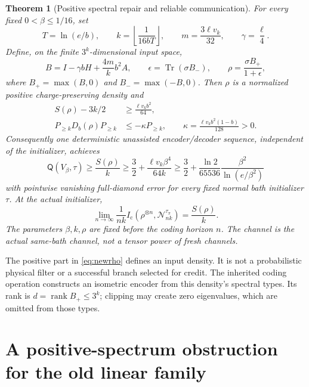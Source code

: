 \documentclass[11pt]{article}
\newtheorem{theorem}{Theorem}[section]
\newcommand{\Tr}{\operatorname{Tr}}
\newcommand{\rank}{\operatorname{rank}}
\newcommand{\Ic}{I_{\mathrm c}}
\newcommand{\Qcap}{\mathsf Q}
\begin{document}
\begin{theorem}[Positive spectral repair and reliable communication]
\label{thm:newrate}
For every fixed \(0<\beta\le1/16\), set
\begin{equation}\label{eq:newk}
 T=\ln(e/b),\qquad k=\left\lfloor\frac1{16bT}\right\rfloor,\qquad
 m=\frac{3\ell v_k}{32},\qquad \gamma=\frac{\ell}{4}.
\end{equation}
Define, on the finite \(3^k\)-dimensional input space,
\begin{equation}\label{eq:newrho}
 B=I-\gamma bH+\frac{4m}{k}b^2A,\qquad
 \epsilon=\Tr(\sigma B_-),\qquad
 \rho=\frac{\sigma B_+}{1+\epsilon},
\end{equation}
where \(B_+=\max(B,0)\) and \(B_-=\max(-B,0)\).
Then \(\rho\) is a normalized positive charge-preserving density and
\begin{align}
 S(\rho)-3k/2&\ge\frac{\ell v_k b^2}{64},\label{eq:newentropy}\\
 P_{\ge k}D_b(\rho)P_{\ge k}
 &\le-\kappa P_{\ge k},\qquad
 \kappa=\frac{\ell v_k b^2(1-b)}{128}>0.\label{eq:exactdrift}
\end{align}
Consequently one deterministic unassisted encoder/decoder sequence,
independent of the initializer, achieves
\begin{equation}\label{eq:newrate}
 \Qcap(V_\beta,\tau)\ge\frac{S(\rho)}k
 \ge\frac32+\frac{\ell v_k\beta^4}{64k}
 \ge\frac32+\frac{\ln2}{65536}
                  \frac{\beta^2}{\ln(e/\beta^2)}
\end{equation}
with pointwise vanishing full-diamond error for every fixed normal bath
initializer \(\tau\). At the actual initializer,
\[
 \lim_{n\to\infty}\frac1{nk}
 \Ic(\rho^{\otimes n},\mathcal N_{nk}^{\tau_\pi})=\frac{S(\rho)}k.
\]
The parameters \(\beta,k,\rho\) are fixed before the coding horizon \(n\).
The channel is the actual same-bath channel, not a tensor power of fresh channels.
\end{theorem}

The positive part in \eqref{eq:newrho} defines an input density. It is not a
probabilistic physical filter or a successful branch selected for credit.
The inherited coding operation constructs an isometric encoder from this
density's spectral types. Its rank is \(d=\rank B_+\le3^k\); clipping
may create zero eigenvalues, which are omitted from those types.

\section{A positive-spectrum obstruction for the old linear family}
\end{document}
